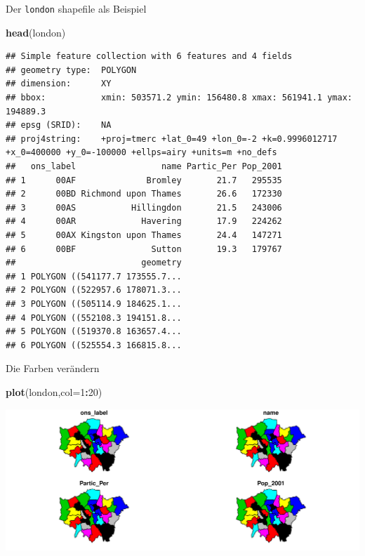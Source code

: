 \documentclass[ignorenonframetext,]{beamer}
\newenvironment{Shaded}{\begin{snugshade}}{\end{snugshade}}
\newcommand{\DataTypeTok}[1]{\textcolor[rgb]{0.13,0.29,0.53}{#1}}
\newcommand{\DecValTok}[1]{\textcolor[rgb]{0.00,0.00,0.81}{#1}}
\newcommand{\KeywordTok}[1]{\textcolor[rgb]{0.13,0.29,0.53}{\textbf{#1}}}
\newcommand{\NormalTok}[1]{#1}
\newcommand{\OperatorTok}[1]{\textcolor[rgb]{0.81,0.36,0.00}{\textbf{#1}}}
\begin{document}
\begin{frame}[fragile]{Der \texttt{london} shapefile als Beispiel}
\protect\hypertarget{der-london-shapefile-als-beispiel}{}

\begin{Shaded}
\begin{Highlighting}[]
\KeywordTok{head}\NormalTok{(london)}
\end{Highlighting}
\end{Shaded}

\begin{verbatim}
## Simple feature collection with 6 features and 4 fields
## geometry type:  POLYGON
## dimension:      XY
## bbox:           xmin: 503571.2 ymin: 156480.8 xmax: 561941.1 ymax: 194889.3
## epsg (SRID):    NA
## proj4string:    +proj=tmerc +lat_0=49 +lon_0=-2 +k=0.9996012717 +x_0=400000 +y_0=-100000 +ellps=airy +units=m +no_defs
##   ons_label                 name Partic_Per Pop_2001
## 1      00AF              Bromley       21.7   295535
## 2      00BD Richmond upon Thames       26.6   172330
## 3      00AS           Hillingdon       21.5   243006
## 4      00AR             Havering       17.9   224262
## 5      00AX Kingston upon Thames       24.4   147271
## 6      00BF               Sutton       19.3   179767
##                         geometry
## 1 POLYGON ((541177.7 173555.7...
## 2 POLYGON ((522957.6 178071.3...
## 3 POLYGON ((505114.9 184625.1...
## 4 POLYGON ((552108.3 194151.8...
## 5 POLYGON ((519370.8 163657.4...
## 6 POLYGON ((525554.3 166815.8...
\end{verbatim}

\end{frame}

\begin{frame}[fragile]{Die Farben verändern}
\protect\hypertarget{die-farben-verandern}{}

\begin{Shaded}
\begin{Highlighting}[]
\KeywordTok{plot}\NormalTok{(london,}\DataTypeTok{col=}\DecValTok{1}\OperatorTok{:}\DecValTok{20}\NormalTok{)}
\end{Highlighting}
\end{Shaded}

\includegraphics{B7_simplefeatures_files/figure-beamer/unnamed-chunk-10-1.pdf}

\end{frame}
\end{document}
